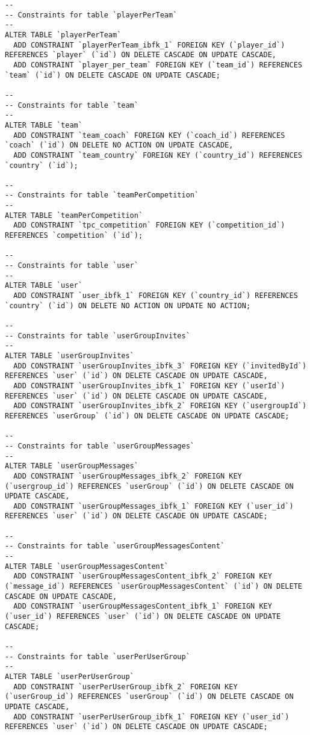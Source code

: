 \documentclass[11pt, a4paper]{article}
\begin{document}
\begin{lstlisting}
--
-- Constraints for table `playerPerTeam`
--
ALTER TABLE `playerPerTeam`
  ADD CONSTRAINT `playerPerTeam_ibfk_1` FOREIGN KEY (`player_id`) REFERENCES `player` (`id`) ON DELETE CASCADE ON UPDATE CASCADE,
  ADD CONSTRAINT `player_per_team` FOREIGN KEY (`team_id`) REFERENCES `team` (`id`) ON DELETE CASCADE ON UPDATE CASCADE;

--
-- Constraints for table `team`
--
ALTER TABLE `team`
  ADD CONSTRAINT `team_coach` FOREIGN KEY (`coach_id`) REFERENCES `coach` (`id`) ON DELETE NO ACTION ON UPDATE CASCADE,
  ADD CONSTRAINT `team_country` FOREIGN KEY (`country_id`) REFERENCES `country` (`id`);

--
-- Constraints for table `teamPerCompetition`
--
ALTER TABLE `teamPerCompetition`
  ADD CONSTRAINT `tpc_competition` FOREIGN KEY (`competition_id`) REFERENCES `competition` (`id`);

--
-- Constraints for table `user`
--
ALTER TABLE `user`
  ADD CONSTRAINT `user_ibfk_1` FOREIGN KEY (`country_id`) REFERENCES `country` (`id`) ON DELETE NO ACTION ON UPDATE NO ACTION;

--
-- Constraints for table `userGroupInvites`
--
ALTER TABLE `userGroupInvites`
  ADD CONSTRAINT `userGroupInvites_ibfk_3` FOREIGN KEY (`invitedById`) REFERENCES `user` (`id`) ON DELETE CASCADE ON UPDATE CASCADE,
  ADD CONSTRAINT `userGroupInvites_ibfk_1` FOREIGN KEY (`userId`) REFERENCES `user` (`id`) ON DELETE CASCADE ON UPDATE CASCADE,
  ADD CONSTRAINT `userGroupInvites_ibfk_2` FOREIGN KEY (`usergroupId`) REFERENCES `userGroup` (`id`) ON DELETE CASCADE ON UPDATE CASCADE;

--
-- Constraints for table `userGroupMessages`
--
ALTER TABLE `userGroupMessages`
  ADD CONSTRAINT `userGroupMessages_ibfk_2` FOREIGN KEY (`usergroup_id`) REFERENCES `userGroup` (`id`) ON DELETE CASCADE ON UPDATE CASCADE,
  ADD CONSTRAINT `userGroupMessages_ibfk_1` FOREIGN KEY (`user_id`) REFERENCES `user` (`id`) ON DELETE CASCADE ON UPDATE CASCADE;

--
-- Constraints for table `userGroupMessagesContent`
--
ALTER TABLE `userGroupMessagesContent`
  ADD CONSTRAINT `userGroupMessagesContent_ibfk_2` FOREIGN KEY (`message_id`) REFERENCES `userGroupMessagesContent` (`id`) ON DELETE CASCADE ON UPDATE CASCADE,
  ADD CONSTRAINT `userGroupMessagesContent_ibfk_1` FOREIGN KEY (`user_id`) REFERENCES `user` (`id`) ON DELETE CASCADE ON UPDATE CASCADE;

--
-- Constraints for table `userPerUserGroup`
--
ALTER TABLE `userPerUserGroup`
  ADD CONSTRAINT `userPerUserGroup_ibfk_2` FOREIGN KEY (`userGroup_id`) REFERENCES `userGroup` (`id`) ON DELETE CASCADE ON UPDATE CASCADE,
  ADD CONSTRAINT `userPerUserGroup_ibfk_1` FOREIGN KEY (`user_id`) REFERENCES `user` (`id`) ON DELETE CASCADE ON UPDATE CASCADE;
\end{lstlisting}
\end{document}
